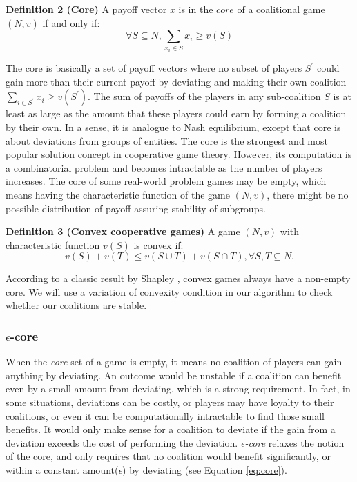 \documentclass[10pt,journal,cspaper,compsoc]{IEEEtran}
\begin{document}

{\bf Definition 2 (Core)} A payoff vector $x$ is in the $core$ of
a coalitional game $(N, v)$ if and only if:
\begin{equation}\label{eq:core}
\forall S \subseteq N, \sum_{x_i \in S} x_i \geq v(S)
\end{equation}

The core is basically a set of payoff vectors where no subset of
players $S^\prime$ could gain more than their current payoff by
deviating and making their own coalition $\sum_{i \in S^\prime}
x_i \geq v(S^\prime)$. The sum of payoffs of the players in any
sub-coalition $S$ is at least as large as the amount that these
players could earn by forming a coalition by their own. In a
sense, it is analogue to Nash equilibrium, except that core is
about deviations from groups of entities. The core is the
strongest and most popular solution concept in cooperative game
theory. However, its computation is a combinatorial problem and
becomes intractable as the number of players increases. The core
of some real-world problem games may be empty, which means having
the characteristic function of the game $(N,v)$, there might be no
possible distribution of payoff assuring stability of subgroups.


{\bf Definition 3 (Convex cooperative games)} A game $(N,v)$ with
characteristic function $v(S)$ is convex if:
\begin{equation}\label{eq:convex}
v(S) + v(T) \leq v(S \cup T) + v (S \cap T), \forall S,T \subseteq
N.
\end{equation}


According to a classic result by Shapley \cite{S1971cores}, convex
games always have a non-empty core. We will use a variation of
convexity condition in our algorithm to check whether our
coalitions are stable.

\subsubsection*{$\epsilon$-core}\label{s:epsilon}
When the \emph{core} set of a game is empty, it means no coalition
of players can gain anything by deviating. An outcome would be
unstable if a coalition can benefit even by a small amount from
deviating, which is a strong requirement. In fact, in some
situations, deviations can be costly, or players may have loyalty
to their coalitions, or even it can be computationally intractable
to find those small benefits. It would only make sense for a
coalition to deviate if the gain from a deviation exceeds the cost
of performing the deviation. \emph{$\epsilon$-core} relaxes the
notion of the core, and only requires that no coalition would
benefit significantly, or within a constant amount($\epsilon$) by
deviating (see Equation \ref{eq:core}).
\end{document}
